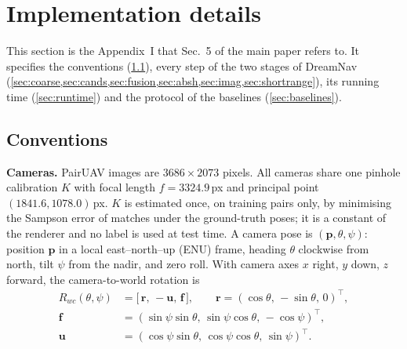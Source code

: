 \section{Implementation details}
\label{sec:impl}

This section is the Appendix~I that Sec.~5 of the main paper refers to. It specifies the conventions (\cref{sec:conv}), every step of the two stages of DreamNav (\cref{sec:coarse,sec:cands,sec:fusion,sec:absh,sec:imag,sec:shortrange}), its running time (\cref{sec:runtime}) and the protocol of the baselines (\cref{sec:baselines}).

\subsection{Conventions}
\label{sec:conv}

\noindent\textbf{Cameras.} PairUAV images are $3686{\times}2073$ pixels. All cameras share one pinhole calibration $K$ with focal length $f{=}3324.9$\,px and principal point $(1841.6, 1078.0)$\,px. $K$ is estimated once, on training pairs only, by minimising the Sampson error of matches under the ground-truth poses; it is a constant of the renderer and no label is used at test time. A camera pose is $(\mathbf{p},\theta,\psi)$: position $\mathbf{p}$ in a local east--north--up (ENU) frame, heading $\theta$ clockwise from north, tilt $\psi$ from the nadir, and zero roll. With camera axes $x$ right, $y$ down, $z$ forward, the camera-to-world rotation is
\begin{equation}
\begin{aligned}
R_{wc}(\theta,\psi)&=\big[\,\mathbf{r},\,-\mathbf{u},\,\mathbf{f}\,\big],\qquad \mathbf{r}=(\cos\theta,\,-\sin\theta,\,0)^{\!\top},\\
\mathbf{f}&=(\sin\psi\sin\theta,\,\sin\psi\cos\theta,\,-\cos\psi)^{\!\top},\\
\mathbf{u}&=(\cos\psi\sin\theta,\,\cos\psi\cos\theta,\,\sin\psi)^{\!\top}.
\end{aligned}
\label{eq:rwc}
\end{equation}


